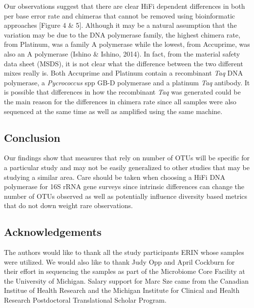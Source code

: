 \documentclass[12pt,]{article}
\begin{document}
Our observations suggest that there are clear HiFi dependent differences
in both per base error rate and chimeras that cannot be removed using
bioinformatic approaches {[}Figure 4 \& 5{]}. Although it may be a
natural assumption that the variation may be due to the DNA polymerase
family, the highest chimera rate, from Platinum, was a family A
polymerase while the lowest, from Accuprime, was also an A polymerase
(Ishino \& Ishino, 2014). In fact, from the material safety data sheet
(MSDS), it is not clear what the difference between the two different
mixes really is. Both Accuprime and Platinum contain a recombinant
\emph{Taq} DNA polymerase, a \emph{Pycrococcus} spp GB-D polymerase and
a platinum \emph{Taq} antibody. It is possible that differences in how
the recombinant \emph{Taq} was generated could be the main reason for
the differences in chimera rate since all samples were also sequenced at
the same time as well as amplified using the same machine.

\newpage

\subsection{Conclusion}\label{conclusion}

Our findings show that measures that rely on number of OTUs will be
specific for a particular study and may not be easily generalized to
other studies that may be studying a similar area. Care should be taken
when choosing a HiFi DNA polymerase for 16S rRNA gene surveys since
intrinsic differences can change the number of OTUs observed as well as
potentially influence diversity based metrics that do not down weight
rare observations.

\newpage

\subsection{Acknowledgements}\label{acknowledgements}

The authors would like to thank all the study participants ERIN whose
samples were utilized. We would also like to thank Judy Opp and April
Cockburn for their effort in sequencing the samples as part of the
Microbiome Core Facility at the University of Michigan. Salary support
for Marc Sze came from the Canadian Institue of Health Research and the
Michigan Institute for Clinical and Health Research Postdoctoral
Translational Scholar Program.

\newpage
\end{document}
